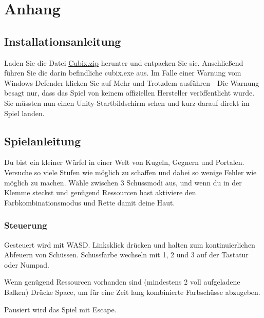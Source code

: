 \documentclass[a4paper,10pt,ngerman,fontsize=12pt]{scrreprt}
\begin{document}
\newpage
\newpage
\chapter{Anhang}




\section{Installationsanleitung}

Laden Sie die Datei \href{https://www.dropbox.com/s/g82vexjznq1x9dd/Cubix.zip?dl=1}{Cubix.zip} herunter und entpacken Sie sie. Anschlie{\ss}end führen Sie die darin befindliche cubix.exe aus.
Im Falle einer Warnung vom Windows-Defender klicken Sie auf Mehr und Trotzdem ausführen - Die Warnung besagt nur, dass das Spiel von keinem offiziellen Hersteller veröffentlicht wurde.
Sie müssten nun einen Unity-Startbildschirm sehen und kurz darauf direkt im Spiel landen.




\section{Spielanleitung}

Du bist ein kleiner Würfel in einer Welt von Kugeln, Gegnern und Portalen. Versuche so viele Stufen wie möglich zu schaffen und dabei so wenige Fehler wie möglich zu machen. Wähle zwischen 3 Schussmodi aus, und wenn du in der Klemme steckst und genügend Ressourcen hast aktiviere den Farbkombinationsmodus und Rette damit deine Haut.



\subsection{Steuerung}

Gesteuert wird mit WASD. Linksklick drücken und halten zum kontinuierlichen Abfeuern von Schüssen. Schussfarbe wechseln mit 1, 2 und 3 auf der Tastatur oder Numpad.

Wenn genügend Ressourcen vorhanden sind (mindestens 2 voll aufgeladene Balken) Drücke Space, um für eine Zeit lang kombinierte Farbschüsse abzugeben.

Pausiert wird das Spiel mit Escape.
\end{document}
